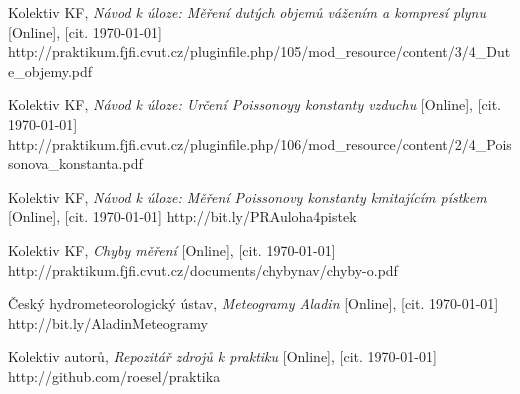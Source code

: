 \documentclass[english]{article}
\begin{document}
\begin{thebibliography}{9}
 Kolektiv KF, \emph{Návod k úloze: Měření dutých objemů vážením a kompresí plynu} [Online], [cit. \today] \newline 
http://praktikum.fjfi.cvut.cz/pluginfile.php/105/mod\_resource/content/3/4\_Dute\_objemy.pdf

 Kolektiv KF, \emph{Návod k úloze: Určení Poissonoyy konstanty vzduchu} [Online], [cit. \today] \newline 
http://praktikum.fjfi.cvut.cz/pluginfile.php/106/mod\_resource/content/2/4\_Poissonova\_konstanta.pdf

 Kolektiv KF, \emph{Návod k úloze: Měření Poissonovy konstanty kmitajícím pístkem} [Online], [cit. \today] \newline 
http://bit.ly/PRAuloha4pistek



 Kolektiv KF, \emph{Chyby měření} [Online], [cit. \today] \newline http://praktikum.fjfi.cvut.cz/documents/chybynav/chyby-o.pdf


 Český hydrometeorologický ústav, \emph{Meteogramy Aladin} [Online], [cit. \today]  \newline
http://bit.ly/AladinMeteogramy


 Kolektiv autorů, \emph{Repozitář zdrojů k praktiku} [Online], [cit. \today] \newline 
http://github.com/roesel/praktika

\end{thebibliography}
\endgroup
\setcounter{equation}{0}
\clearpage
\end{document}
